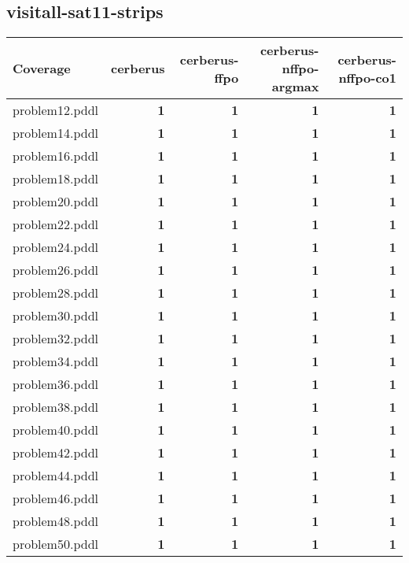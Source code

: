 \documentclass{article}
\begin{document}
\hypertarget{coverage-visitall-sat11-strips}{}
\subsection*{visitall-sat11-strips}

\begin{tabular}{@{}lrrrr@{}}
Coverage & cerberus & cerberus-ffpo & cerberus-nffpo-argmax & cerberus-nffpo-co1 \\
\midrule
problem12.pddl & \textbf{1} & \textbf{1} & \textbf{1} & \textbf{1} \\
problem14.pddl & \textbf{1} & \textbf{1} & \textbf{1} & \textbf{1} \\
problem16.pddl & \textbf{1} & \textbf{1} & \textbf{1} & \textbf{1} \\
problem18.pddl & \textbf{1} & \textbf{1} & \textbf{1} & \textbf{1} \\
problem20.pddl & \textbf{1} & \textbf{1} & \textbf{1} & \textbf{1} \\
problem22.pddl & \textbf{1} & \textbf{1} & \textbf{1} & \textbf{1} \\
problem24.pddl & \textbf{1} & \textbf{1} & \textbf{1} & \textbf{1} \\
problem26.pddl & \textbf{1} & \textbf{1} & \textbf{1} & \textbf{1} \\
problem28.pddl & \textbf{1} & \textbf{1} & \textbf{1} & \textbf{1} \\
problem30.pddl & \textbf{1} & \textbf{1} & \textbf{1} & \textbf{1} \\
problem32.pddl & \textbf{1} & \textbf{1} & \textbf{1} & \textbf{1} \\
problem34.pddl & \textbf{1} & \textbf{1} & \textbf{1} & \textbf{1} \\
problem36.pddl & \textbf{1} & \textbf{1} & \textbf{1} & \textbf{1} \\
problem38.pddl & \textbf{1} & \textbf{1} & \textbf{1} & \textbf{1} \\
problem40.pddl & \textbf{1} & \textbf{1} & \textbf{1} & \textbf{1} \\
problem42.pddl & \textbf{1} & \textbf{1} & \textbf{1} & \textbf{1} \\
problem44.pddl & \textbf{1} & \textbf{1} & \textbf{1} & \textbf{1} \\
problem46.pddl & \textbf{1} & \textbf{1} & \textbf{1} & \textbf{1} \\
problem48.pddl & \textbf{1} & \textbf{1} & \textbf{1} & \textbf{1} \\
problem50.pddl & \textbf{1} & \textbf{1} & \textbf{1} & \textbf{1} \\
\end{tabular}
\end{document}
